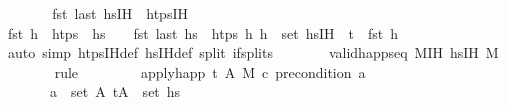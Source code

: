 \begin{isabellebody}
\ \ \ \ \isamarkupfalse%
\ \isamarkupfalse%
\ {\isachardoublequoteopen}{\isacharparenleft}{\kern0pt}fst\ {\isacharparenleft}{\kern0pt}last\ hs{\isacharprime}{\kern0pt}{\isacharunderscore}{\kern0pt}IH{\isacharparenright}{\kern0pt}{\isacharparenright}{\kern0pt}\ {\isasymin}\ htps{\isacharunderscore}{\kern0pt}IH{\isachardoublequoteclose}\isanewline
\ \ \ \ \ \ \isamarkupfalse%
\ {\isacartoucheopen}fst\ h{}\ {\isasymin}\ htps{\isacartoucheclose}\ \ {\isacartoucheopen}hs{\isacharprime}{\kern0pt}\ {\isasymnoteq}\ {\isacharbrackleft}{\kern0pt}{\isacharbrackright}{\kern0pt}\ {\isasymLongrightarrow}\ fst\ {\isacharparenleft}{\kern0pt}last\ hs{\isacharprime}{\kern0pt}{\isacharparenright}{\kern0pt}\ {\isasymin}\ htps{\isacartoucheclose}\ {\isacartoucheopen}{\isasymAnd}h{\isacharprime}{\kern0pt}{\isachardot}{\kern0pt}\ h{\isacharprime}{\kern0pt}\ {\isasymin}\ set\ hs{\isacharprime}{\kern0pt}{\isacharunderscore}{\kern0pt}IH\ {\isasymLongrightarrow}\ t{\isacharprime}{\kern0pt}\ {\isasymnoteq}\ fst\ h{\isacharprime}{\kern0pt}{\isacartoucheclose}\isanewline
\ \ \ \ \ \ \isamarkupfalse%
\ {\isacharparenleft}{\kern0pt}auto\ simp{\isacharcolon}{\kern0pt}\ htps{\isacharunderscore}{\kern0pt}IH{\isacharunderscore}{\kern0pt}def\ hs{\isacharprime}{\kern0pt}{\isacharunderscore}{\kern0pt}IH{\isacharunderscore}{\kern0pt}def\ split{\isacharcolon}{\kern0pt}\ if{\isacharunderscore}{\kern0pt}splits{\isacharparenright}{\kern0pt}{\isacharplus}{\kern0pt}\isanewline
\ \ \ \ \isamarkupfalse%
\ \isamarkupfalse%
\ {\isachardoublequoteopen}valid{\isacharunderscore}{\kern0pt}happ{\isacharunderscore}{\kern0pt}seq\ M{\isacharunderscore}{\kern0pt}IH\ hs{\isacharprime}{\kern0pt}{\isacharunderscore}{\kern0pt}IH\ M{\isacharprime}{\kern0pt}{\isachardoublequoteclose}\isanewline
\ \ \ \ \ \ \isamarkupfalse%
\ {\isacharparenleft}{\kern0pt}rule\ {}{\isacharparenright}{\kern0pt}\isanewline
\ \ \ \ \isamarkupfalse%
\ \isamarkupfalse%
\ {\isachardoublequoteopen}{\isacharparenleft}{\kern0pt}apply{\isacharunderscore}{\kern0pt}happ\ {\isacharparenleft}{\kern0pt}t{\isacharcomma}{\kern0pt}\ A{\isacharprime}{\kern0pt}{\isacharparenright}{\kern0pt}\ M{\isacharparenright}{\kern0pt}\ \isactrlsup c{\isasymTTurnstile}\isactrlsub {\isacharequal}{\kern0pt}\ precondition\ a{\isachardoublequoteclose}\isanewline
\ \ \ \ \ \ \ {\isachardoublequoteopen}a\ {\isasymin}\ set\ A{\isacharprime}{\kern0pt}{\isacharprime}{\kern0pt}{\isachardoublequoteclose}\ {\isachardoublequoteopen}{\isacharparenleft}{\kern0pt}t{\isacharprime}{\kern0pt}{\isacharprime}{\kern0pt}{\isacharcomma}{\kern0pt}A{\isacharprime}{\kern0pt}{\isacharprime}{\kern0pt}{\isacharparenright}{\kern0pt}\ {\isasymin}\ set\ hs{}{\isacharprime}{\kern0pt}{\isachardoublequoteclose}\isanewline

\end{isabellebody}
